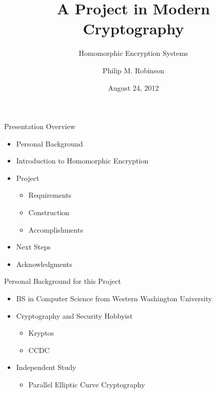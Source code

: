 \documentclass[dvips,11pt]{beamer}
\begin{document}
\title{A Project in Modern Cryptography}

\subtitle{Homomorphic Encryption Systems}

\author{Philip M. Robinson}


\date{August 24, 2012}

\begin{frame}
  \titlepage
\end{frame}


\begin{frame}{Presentation Overview}

\begin{itemize}
  \item Personal Background
  \item Introduction to Homomorphic Encryption
  \item Project 
    \begin{itemize}
    \item Requirements
    \item Construction
    \item Accomplishments
    \end{itemize}
  \item Next Steps
  \item Acknowledgments
\end{itemize}

\end{frame}

\begin{frame}{Personal Background for this Project}
  \begin{itemize}
  \item BS in Computer Science from Western Washington University
  \item Cryptography and Security Hobbyist
    \begin{itemize}
      \item Kryptos
      \item CCDC
    \end{itemize}
  \item Independent Study
    \begin{itemize}
      \item Parallel Elliptic Curve Cryptography
    \end{itemize}
  \end{itemize}
\end{frame}
\end{document}
